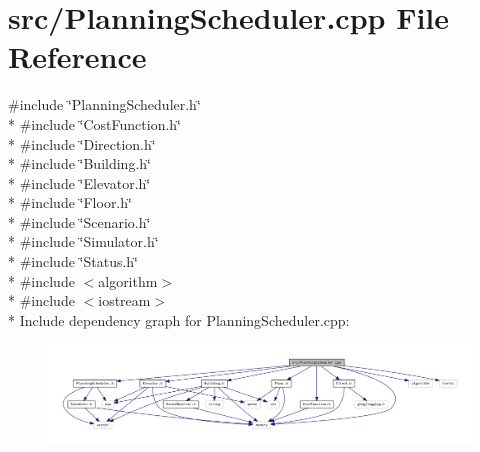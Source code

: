 \section{src/\+Planning\+Scheduler.cpp File Reference}
\label{_planning_scheduler_8cpp}
{\ttfamily \#include \char`\"{}Planning\+Scheduler.\+h\char`\"{}}\\*
{\ttfamily \#include \char`\"{}Cost\+Function.\+h\char`\"{}}\\*
{\ttfamily \#include \char`\"{}Direction.\+h\char`\"{}}\\*
{\ttfamily \#include \char`\"{}Building.\+h\char`\"{}}\\*
{\ttfamily \#include \char`\"{}Elevator.\+h\char`\"{}}\\*
{\ttfamily \#include \char`\"{}Floor.\+h\char`\"{}}\\*
{\ttfamily \#include \char`\"{}Scenario.\+h\char`\"{}}\\*
{\ttfamily \#include \char`\"{}Simulator.\+h\char`\"{}}\\*
{\ttfamily \#include \char`\"{}Status.\+h\char`\"{}}\\*
{\ttfamily \#include $<$algorithm$>$}\\*
{\ttfamily \#include $<$iostream$>$}\\*
Include dependency graph for Planning\+Scheduler.\+cpp\+:
\nopagebreak
\begin{figure}[H]
\begin{center}
\leavevmode
\includegraphics[width=350pt]{_planning_scheduler_8cpp__incl}
\end{center}
\end{figure}
